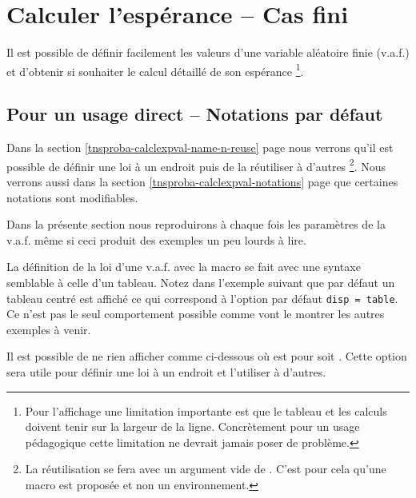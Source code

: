 \documentclass[12pt,a4paper]{article}
\begin{document}
\section{Calculer l'espérance -- Cas fini}

Il est possible de définir facilement les valeurs d'une variable aléatoire finie (v.a.f.) et d'obtenir si souhaiter le calcul détaillé de son espérance
\footnote{
    Pour l'affichage une limitation importante est que le tableau et les calculs doivent tenir sur la largeur de la ligne.
    Concrètement pour un usage pédagogique cette limitation ne devrait jamais poser de problème.
}.




\subsection{Pour un usage direct -- Notations par défaut}

Dans la section \ref{tnsproba-calclexpval-name-n-reuse} page \pageref{tnsproba-calclexpval-name-n-reuse} nous verrons qu'il est possible de définir une loi à un endroit puis de la réutiliser à d'autres
\footnote{
    La réutilisation se fera avec un argument vide de . C'est pour cela qu'une macro est proposée et non un environnement.
}.
Nous verrons aussi dans la section \ref{tnsproba-calclexpval-notations} page \pageref{tnsproba-calclexpval-notations} que certaines notations sont modifiables.

\medskip

Dans la présente section nous reproduirons à chaque fois les paramètres de la v.a.f. même si ceci produit des exemples un peu lourds à lire.





La définition de la loi d'une v.a.f. avec la macro  se fait avec une syntaxe semblable à celle d'un tableau.
Notez dans l'exemple suivant que par défaut un tableau centré est affiché ce qui correspond à l'option par  défaut \verb#disp = table#.
Ce n'est pas le seul comportement possible comme vont le montrer les autres exemples à venir.



\begin{remark}
    Il est possible de ne rien afficher comme ci-dessous où  est pour  soit .
    Cette option sera utile pour définir une loi à un endroit et l'utiliser à d'autres.

\end{remark}
\end{document}
